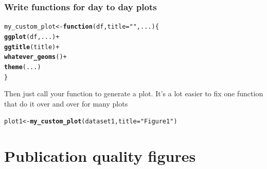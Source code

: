 \documentclass{beamer}\usepackage[]{graphicx}\usepackage[]{color}
\makeatletter
\newcommand{\hlstr}[1]{\textcolor[rgb]{0.192,0.494,0.8}{#1}}%
\newcommand{\hlopt}[1]{\textcolor[rgb]{0,0,0}{#1}}%
\newcommand{\hlstd}[1]{\textcolor[rgb]{0.345,0.345,0.345}{#1}}%
\newcommand{\hlkwa}[1]{\textcolor[rgb]{0.161,0.373,0.58}{\textbf{#1}}}%
\newcommand{\hlkwb}[1]{\textcolor[rgb]{0.69,0.353,0.396}{#1}}%
\newcommand{\hlkwc}[1]{\textcolor[rgb]{0.333,0.667,0.333}{#1}}%
\newcommand{\hlkwd}[1]{\textcolor[rgb]{0.737,0.353,0.396}{\textbf{#1}}}%
\newenvironment{kframe}{%
 \def\at@end@of@kframe{}%
 \ifinner\ifhmode%
  \def\at@end@of@kframe{\end{minipage}}%
  \begin{minipage}{\columnwidth}%
 \fi\fi%
 \def\FrameCommand##1{\hskip\@totalleftmargin \hskip-\fboxsep
 \colorbox{shadecolor}{##1}\hskip-\fboxsep
     \hskip-\linewidth \hskip-\@totalleftmargin \hskip\columnwidth}%
 \MakeFramed {\advance\hsize-\width
   \@totalleftmargin\z@ \linewidth\hsize
   \@setminipage}}%
 {\par\unskip\endMakeFramed%
 \at@end@of@kframe}
\newenvironment{knitrout}{}{} %
\makeatother
\begin{document}
\begin{frame}[fragile]
\frametitle{Write functions for day to day plots}
\begin{knitrout}\footnotesize
{}\color{fgcolor}\begin{kframe}
\begin{alltt}
\hlstd{my_custom_plot} \hlkwb{<-} \hlkwa{function}\hlstd{(}\hlkwc{df}\hlstd{,} \hlkwc{title} \hlstd{=} \hlstr{""}\hlstd{,} \hlkwc{...}\hlstd{) \{}
    \hlkwd{ggplot}\hlstd{(df, ...)} \hlopt{+}
    \hlkwd{ggtitle}\hlstd{(title)} \hlopt{+}
    \hlkwd{whatever_geoms}\hlstd{()} \hlopt{+}
    \hlkwd{theme}\hlstd{(...)}
\hlstd{\}}
\end{alltt}
\end{kframe}
\end{knitrout}

Then just call your function to generate a plot.
It's a lot easier to fix one function that do it over and over for many plots
\begin{knitrout}\footnotesize
{}\color{fgcolor}\begin{kframe}
\begin{alltt}
\hlstd{plot1} \hlkwb{<-} \hlkwd{my_custom_plot}\hlstd{(dataset1,} \hlkwc{title} \hlstd{=} \hlstr{"Figure 1"}\hlstd{)}
\end{alltt}
\end{kframe}
\end{knitrout}

\end{frame}



\section*{Publication quality figures}
\frame{\sectionpage}


\end{document}
